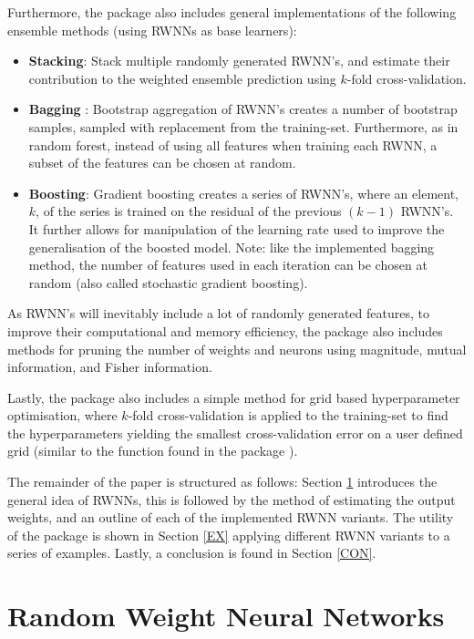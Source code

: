 \documentclass[
]{jss}
\providecommand{\tightlist}{%
  \setlength{\itemsep}{0pt}\setlength{\parskip}{0pt}}
\begin{document}
Furthermore, the  package also includes general
implementations of the following ensemble methods (using RWNNs as base
learners):

\begin{itemize}
\tightlist
\item
  \textbf{Stacking}: Stack multiple randomly generated RWNN's, and
  estimate their contribution to the weighted ensemble prediction using
  \(k\)-fold cross-validation.
\item
  \textbf{Bagging} \citep{Xin2021}: Bootstrap aggregation of RWNN's
  creates a number of bootstrap samples, sampled with replacement from
  the training-set. Furthermore, as in random forest, instead of using
  all features when training each RWNN, a subset of the features can be
  chosen at random.
\item
  \textbf{Boosting}: Gradient boosting creates a series of RWNN's, where
  an element, \(k\), of the series is trained on the residual of the
  previous \((k - 1)\) RWNN's. It further allows for manipulation of the
  learning rate used to improve the generalisation of the boosted model.
  Note: like the implemented bagging method, the number of features used
  in each iteration can be chosen at random (also called stochastic
  gradient boosting).
\end{itemize}

As RWNN's will inevitably include a lot of randomly generated features,
to improve their computational and memory efficiency, the 
package also includes methods for pruning the number of weights and
neurons using magnitude, mutual information, and Fisher information.

Lastly, the  package also includes a simple method for grid
based hyperparameter optimisation, where \(k\)-fold cross-validation is
applied to the training-set to find the hyperparameters yielding the
smallest cross-validation error on a user defined grid (similar to the
 function found in the package ).

The remainder of the paper is structured as follows: Section \ref{RWNN}
introduces the general idea of RWNNs, this is followed by the method of
estimating the output weights, and an outline of each of the implemented
RWNN variants. The utility of the  package is shown in Section
\ref{EX} applying different RWNN variants to a series of examples.
Lastly, a conclusion is found in Section \ref{CON}.

\hypertarget{RWNN}{%
\section{Random Weight Neural Networks}\label{RWNN}}
\end{document}
